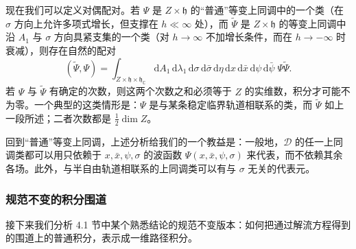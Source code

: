 \documentclass[11pt,a4paper,UTF8]{ctexart}
\theoremstyle{plain}
\theoremstyle{definition}
\begin{document}

现在我们可以定义对偶配对。若 $\Psi$ 是 $Z\times\mathfrak h$ 的“普通”等变上同调中的一个类（在 $\sigma$ 方向上允许多项式增长，但支撑在 $h\ll\infty$ 处），而 $\tilde\Psi$ 是 $Z\times\mathfrak h$ 的等变上同调中沿 $A_1$ 与 $\sigma$ 方向具紧支集的一个类（对 $h\to\infty$ 不加增长条件，而在 $h\to-\infty$ 时衰减），则存在自然的配对
\begin{equation}
    (\tilde\Psi,\Psi)=\int_{Z\times\mathfrak h\times\mathfrak h_{\mathbb C}}
    \mathrm dA_1\,\mathrm d\lambda_1\,\mathrm d\sigma\,\mathrm d\bar\sigma\,\mathrm d\eta\,
    \mathrm dx\,\mathrm d\bar x\,\mathrm d\psi\,\mathrm d\bar\psi\;\Psi\tilde\Psi.
    \tag{5.28}
\end{equation}
若 $\Psi$ 与 $\tilde\Psi$ 有确定的次数，则这两个次数之和必须等于 $Z$ 的实维数，积分才可能不为零。一个典型的这类情形是：$\Psi$ 是与某条稳定临界轨道相联系的类，而 $\tilde\Psi$ 如上一段所述；二者次数都是 $\frac12\dim Z$。


回到“普通”等变上同调，上述分析给我们的一个教益是：一般地，$\mathcal D$ 的任一上同调类都可以用只依赖于 $x,\bar x,\psi,\sigma$ 的波函数 $\Psi(x,\bar x,\psi,\sigma)$ 来代表，而不依赖其余各场。此外，与半自由轨道相联系的上同调类可以有与 $\sigma$ 无关的代表元。

\subsubsection{规范不变的积分围道}

接下来我们分析 4.1 节中某个熟悉结论的规范不变版本：如何把通过解流方程得到的围道上的普通积分，表示成一维路径积分。
\end{document}
